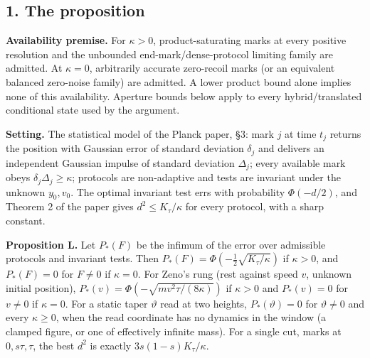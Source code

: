 \documentclass[11pt,a4paper]{article}
\begin{document}
\hypertarget{the-proposition}{%
\subsection{1. The proposition}\label{the-proposition}}

\textbf{Availability premise.} For \(\kappa>0\), product-saturating
marks at every positive resolution and the unbounded
end-mark/dense-protocol limiting family are admitted. At \(\kappa=0\),
arbitrarily accurate zero-recoil marks (or an equivalent balanced
zero-noise family) are admitted. A lower product bound alone implies
none of this availability. Aperture bounds below apply to every
hybrid/translated conditional state used by the argument.

\textbf{Setting.} The statistical model of the Planck paper, §3: mark
\(j\) at time \(t_j\) returns the position with Gaussian error of
standard deviation \(\delta_j\) and delivers an independent Gaussian
impulse of standard deviation \(\Delta_j\); every available mark obeys
\(\delta_j\Delta_j\ge\kappa\); protocols are non-adaptive and tests are
invariant under the unknown \(y_0,v_0\). The optimal invariant test errs
with probability \(\Phi(-d/2)\), and Theorem 2 of the paper gives
\(d^2\le K_\tau/\kappa\) for every protocol, with a sharp constant.

\textbf{Proposition L.} Let \(P_*(F)\) be the infimum of the error over
admissible protocols and invariant tests. Then
\(P_*(F)=\Phi(-\frac12\sqrt{K_\tau/\kappa})\) if \(\kappa>0\), and
\(P_*(F)=0\) for \(F\ne0\) if \(\kappa=0\). For Zeno's rung (rest
against speed \(v\), unknown initial position),
\(P_*(v)=\Phi(-\sqrt{mv^2\tau/(8\kappa)})\) if \(\kappa>0\) and
\(P_*(v)=0\) for \(v\ne0\) if \(\kappa=0\). For a static taper
\(\vartheta\) read at two heights, \(P_*(\vartheta)=0\) for
\(\vartheta\ne0\) and every \(\kappa\ge0\), when the read coordinate has
no dynamics in the window (a clamped figure, or one of effectively
infinite mass). For a single cut, marks at \(0,s\tau,\tau\), the best
\(d^2\) is exactly \(3s(1-s)K_\tau/\kappa\).
\end{document}
